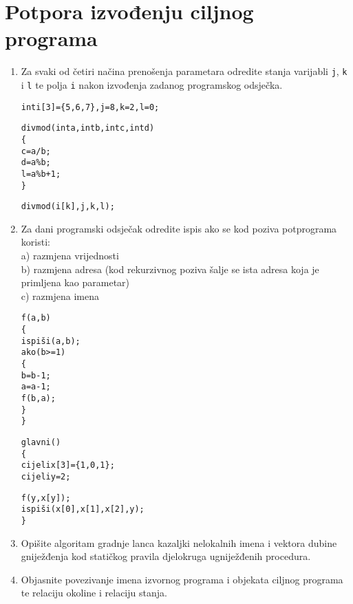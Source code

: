 \documentclass[times, 12pt, utf8]{book}
\begin{document}

\chapter{Potpora izvođenju ciljnog programa}


\begin{enumerate}[resume]

\item
Za svaki od četiri načina prenošenja parametara odredite stanja varijabli \texttt{j}, \texttt{k} i \texttt{l} te polja \texttt{i} nakon izvođenja zadanog programskog odsječka. \cite[str.~243-252]{udzbenik}

\begin{alltt}
int i[3]=\verb|{|5,6,7\verb|}|,j=8,k=2,l=0;

divmod(int a,int b,int c,int d)
\verb|{|
  c=a/b;  
  d=a\%b;
  l=a\%b+1;
\verb|}|

divmod(i[k],j,k,l);
\end{alltt} 

\item
Za dani programski odsječak odredite ispis ako se kod poziva potprograma koristi: \cite[str.~243-252]{udzbenik}\\
a) razmjena vrijednosti \\
b) razmjena adresa (kod rekurzivnog poziva šalje se ista adresa koja je primljena kao parametar) \\
c) razmjena imena

\begin{alltt}
f(a,b)
\verb|{|
   ispiši(a,b);
   ako (b>=1)
   \verb|{|
      b=b-1;
      a=a-1;
      f(b,a);
   \verb|}|
\verb|}|

glavni()
\verb|{|
   cijeli x[3]=\verb|{|1,0,1\verb|}|;
   cijeli y=2;

   f(y,x[y]);
   ispiši(x[0],x[1],x[2],y);
\verb|}|
\end{alltt} 

\item
Opišite algoritam gradnje lanca kazaljki nelokalnih imena i vektora dubine gniježđenja kod statičkog pravila djelokruga ugniježđenih procedura. \cite[str.~239]{udzbenik}

\item
Objasnite povezivanje imena izvornog programa i objekata ciljnog programa te relaciju okoline i relaciju stanja. \cite[str.~221-222]{udzbenik}


\end{enumerate}
\end{document}
